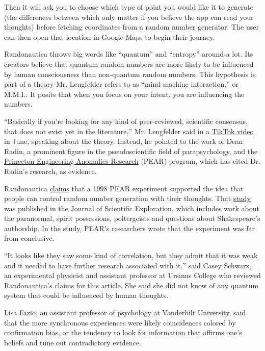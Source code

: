 Then it will ask you to choose which type of point you would like it to
generate (the differences between which only matter if you believe the
app can read your thoughts) before fetching coordinates from a random
number generator. The user can then open that location in Google Maps to
begin their journey.

Randonautica throws big words like ``quantum'' and ``entropy'' around a
lot. Its creators believe that quantum random numbers are more likely to
be influenced by human consciousness than non-quantum random numbers.
This hypothesis is part of a theory Mr. Lengfelder refers to as
``mind-machine interaction,'' or M.M.I.: It posits that when you focus
on your intent, you are influencing the numbers.

``Basically if you're looking for any kind of peer-reviewed, scientific
consensus, that does not exist yet in the literature,'' Mr. Lengfelder
said in a \href{https://vm.tiktok.com/JF7gotD/}{TikTok video} in June,
speaking about the theory. Instead, he pointed to the work of Dean
Radin, a prominent figure in the pseudoscientific field of
parapsychology, and the
\href{https://www.nytimes3xbfgragh.onion/2003/03/09/nyregion/mind-over-matter.html?searchResultPosition=1}{Princeton
Engineering Anomalies Research} (PEAR) program, which has cited Dr.
Radin's research, as evidence.

Randonautica
\href{https://old.reddit.com/r/randonauts/wiki/theory}{claims} that a
1998 PEAR experiment supported the idea that people can control random
number generation with their thoughts. That
\href{http://noosphere.princeton.edu/papers/pear/fieldreg2.pdf}{study}
was published in the Journal of Scientific Exploration, which includes
work about the paranormal, spirit possessions, poltergeists and
questions about Shakespeare's authorship. In the study, PEAR's
researchers wrote that the experiment was far from conclusive.

``It looks like they saw some kind of correlation, but they admit that
it was weak and it needed to have further research associated with it,''
said Casey Schwarz, an experimental physicist and assistant professor at
Ursinus College who reviewed Randonautica's claims for this article. She
said she did not know of any quantum system that could be influenced by
human thoughts.

Lisa Fazio, an assistant professor of psychology at Vanderbilt
University, said that the more synchronous experiences were likely
coincidences colored by confirmation bias, or the tendency to look for
information that affirms one's beliefs and tune out contradictory
evidence.

